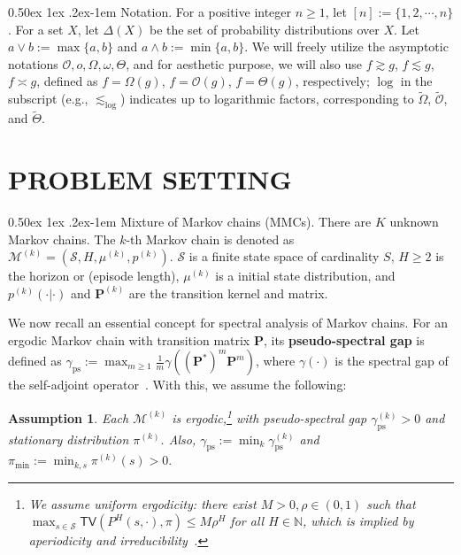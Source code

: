 \documentclass[twoside]{article}
\makeatletter
\renewcommand{\paragraph}{%
  \@startsection{paragraph}{4}%
  {\z@}{0.50ex \@plus 1ex \@minus .2ex}{-1em}%
  {\normalfont\normalsize\bfseries}%
}
\def\TV{\mathsf{TV}}
\def\mP{{\bm{P}}}
\def\gM{{\mathcal{M}}}
\def\gO{{\mathcal{O}}}
\def\gS{{\mathcal{S}}}
\def\sN{{\mathbb{N}}}
\theoremstyle{plain}
\newtheorem{assumption}{Assumption}
\newcommand{\ps}{\mathrm{ps}}
\makeatother
\begin{document}
\paragraph{Notation.}
For a positive integer $n \geq 1$, let $[n] := \{1, 2, \cdots, n\}$.
For a set $X$, let $\Delta(X)$ be the set of probability distributions over $X$.
Let $a \vee b := \max\{a, b\}$ and $a \wedge b := \min\{a, b\}$.
We will freely utilize the asymptotic notations $\gO, o, \Omega, \omega, \Theta$, and for aesthetic purpose, we will also use $f \gtrsim g$, $f \lesssim g$, $f \asymp g$, defined as $f = \Omega(g)$, $f = \gO(g)$, $f = \Theta(g)$, respectively; $\log$ in the subscript (e.g., $\lesssim_{\log}$) indicates up to logarithmic factors, corresponding to $\widetilde{\Omega}$, $\widetilde{\gO}$, and $\widetilde{\Theta}$.


\section{PROBLEM SETTING}
\label{sec:setting}
\paragraph{Mixture of Markov chains (MMCs).}
There are $K$ unknown Markov chains. The $k$-th Markov chain is denoted as $\gM^{(k)} = (\gS, H, \mu^{(k)}, p^{(k)})$. $\gS$ is a finite state space of cardinality $S$, $H \geq 2$ is the horizon or (episode length), $\mu^{(k)}$ is a initial state distribution, and $p^{(k)}(\cdot | \cdot)$ and $\mP^{(k)}$ are the transition kernel and matrix.

We now recall an essential concept for spectral analysis of Markov chains.
For an ergodic Markov chain with transition matrix $\mP$, its \textbf{pseudo-spectral gap} is defined as $\gamma_\ps := \max_{m \geq 1} \frac{1}{m} \gamma\left( (\mP^*)^m \mP^m \right)$, where $\gamma(\cdot)$ is the spectral gap of the self-adjoint operator~\citep[Section 3]{paulin2015markov}.
With this, we assume the following:
\begin{assumption}
\label{assumption:ergodic}
    Each $\gM^{(k)}$ is ergodic,\footnote{We assume uniform ergodicity: there exist $M > 0, \rho \in (0, 1)$ such that $\max_{s \in \gS} \TV( P^H(s, \cdot), \pi) \leq M \rho^H$ for all $H \in \sN$, which is implied by aperiodicity and irreducibility~\citep[Theorem 4.9]{markovmixing}.} with pseudo-spectral gap $\gamma_\ps^{(k)} > 0$ and stationary distribution $\pi^{(k)}$.
    Also, $\gamma_\ps := \min_k \gamma_\ps^{(k)}$ and $\pi_{\min} := \min_{k, s} \pi^{(k)}(s) > 0.$
\end{assumption}
\end{document}
